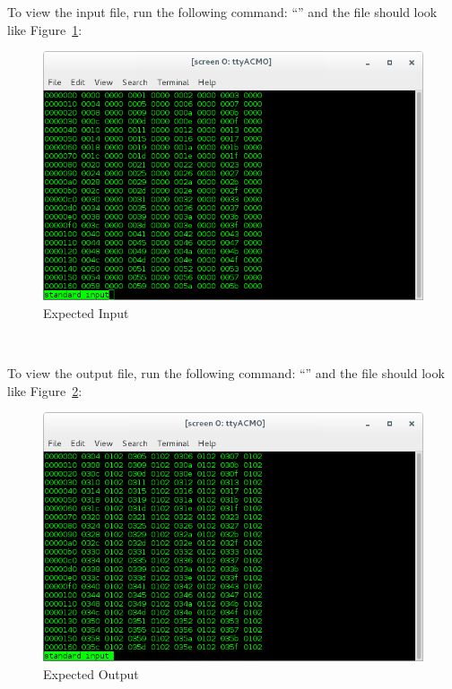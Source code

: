 \begin{minipage}{\linewidth}
To view the input file, run the following command: ``'' and the file should look like Figure~\ref{fig:inBias1}: \\ \medskip
\begin{figure}[H]
	\centerline{\includegraphics[scale=0.5]{zed_bias_input}}
	\caption{Expected Input}
	\label{fig:inBias1}
\end{figure}
\end{minipage}
~\\
\begin{minipage}{\linewidth}
To view the output file, run the following command: ``'' and the file should look like Figure~\ref{fig:outBias1}: \\
\begin{figure}[H]
	\centerline{\includegraphics[scale=0.5]{zed_bias_output}}
	\caption{Expected Output}
	\label{fig:outBias1}
\end{figure}
\end{minipage}
~\\
\newpage
